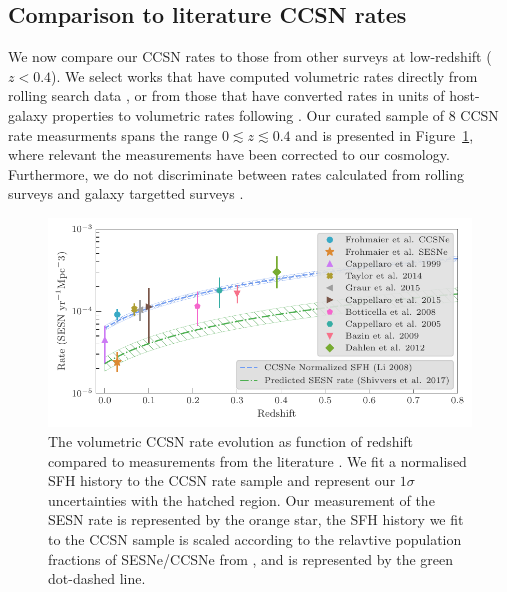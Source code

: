 \documentclass[a4paper,fleqn,usenatbib]{mnras}
\begin{document}
\subsection{Comparison to literature CCSN rates}

We now compare our CCSN rates to those from other surveys at low-redshift ($z<0.4$). We select works that have computed volumetric rates directly from rolling search data \citep[e.g.][]{2009A&A...499..653B}, or from those that have converted rates in units of host-galaxy properties to volumetric rates following \citet{2008A&A...479...49B}. Our curated sample of 8 CCSN rate measurments spans the range $0\lesssim z \lesssim 0.4$ and is presented in Figure~\ref{fig:rates_CC_lit}, where relevant the measurements have been corrected to our cosmology. Furthermore, we do not discriminate between rates calculated from rolling surveys \citep[e.g.][]{2009A&A...499..653B} and galaxy targetted surveys \citep[e.g.][]{1999A&A...351..459C}.

\begin{figure}
	\includegraphics[width=\linewidth]{./allCC_Compare_Literature.pdf}
    \caption{The volumetric CCSN rate evolution as function of redshift compared to measurements from the literature \citep{1999A&A...351..459C,2014ApJ...792..135T,2015MNRAS.450..905G,2015A&A...584A..62C,2008A&A...479...49B,2005A&A...430...83C,2009A&A...499..653B,2012ApJ...757...70D}. We fit a normalised SFH history \citep[blue dashed line;][]{2008MNRAS.388.1487L} to the CCSN rate sample and represent our $1\sigma$ uncertainties with the hatched region. Our measurement of the SESN rate is represented by the orange star, the SFH history we fit to the CCSN sample is scaled according to the relavtive population fractions of SESNe/CCSNe from \citet{2017PASP..129e4201S}, and is represented by the green dot-dashed line.}
    \label{fig:rates_CC_lit}
\end{figure}
\end{document}
